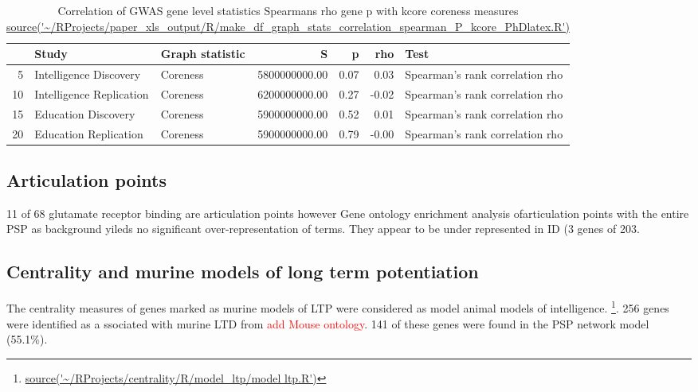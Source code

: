 \begin{table}[ht]
\centering
  \begin{adjustbox}{max width=\textwidth}
\begin{tabular}{rllrrrl}
  \hline
 & Study & Graph statistic & S & p & rho & Test \\ 
  \hline
5 & Intelligence Discovery & Coreness & 5800000000.00 & 0.07 & 0.03 & Spearman's rank correlation rho \\ 
  10 & Intelligence Replication & Coreness & 6200000000.00 & 0.27 & -0.02 & Spearman's rank correlation rho \\ 
  15 & Education Discovery & Coreness & 5900000000.00 & 0.52 & 0.01 & Spearman's rank correlation rho \\ 
  20 & Education Replication & Coreness & 5900000000.00 & 0.79 & -0.00 & Spearman's rank correlation rho \\ 
   \hline
\end{tabular}
\end{adjustbox}
\caption{Correlation of GWAS gene level statistics Spearmans rho gene p with kcore coreness measures \url{source('~/RProjects/paper_xls_output/R/make_df_graph_stats_correlation_spearman_P_kcore_PhDlatex.R')}} 
\label{Table:Correlation of GWAS gene level statistics Spearmans rho gene p  with kcorecoreness measures}
\end{table}




\subsection{Articulation points}
11 of 68 glutamate receptor binding are articulation points however Gene ontology enrichment analysis ofarticulation points with the entire PSP as background yileds no significant over-representation of terms. They appear to be under represented in ID (3 genes of 203.	 	

\subsection{Centrality and murine models of long term potentiation}

    The centrality measures of genes marked as murine models of LTP were considered as model animal models of intelligence. \footnote{\url{source('~/RProjects/centrality/R/model_ltp/model ltp.R')}}.
    256 genes were identified as a
    ssociated with murine LTD from \textcolor{red}{add Mouse ontology}. 141 of these genes were found in the PSP network model (55.1\%).
    
